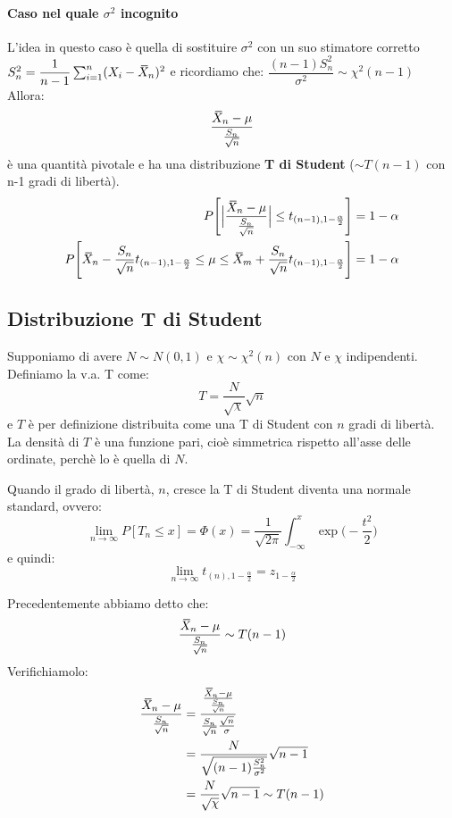 \documentclass[12pt]{report}
\newcommand{\wbar}[1]{%
	\accentset{\mbox{\rule{0.55em}{0.5pt}}}{#1}%
}
\begin{document}
	 \paragraph{Caso nel quale $\sigma^2$ incognito} L'idea in questo caso è quella di sostituire $\sigma^2$ con un suo stimatore corretto $S_n^2 = \dfrac{1}{n-1}\sum_{i=1}^{n}(X_i - \wbar{X}_n)^2$ e ricordiamo che: $\dfrac{(n-1)S_n^2}{\sigma^2} \sim \chi^2(n-1)$ \\
	 Allora:
	 \[
	 \dfrac{\wbar{X}_n - \mu}{\frac{S_n}{\sqrt{n}}}
	 \]
	 è una quantità pivotale e ha una distribuzione \textbf{T di Student} ($\sim T(n-1)$ con n-1 gradi di libertà). \\
	 \begin{align*}
	 	P\Bigg[\Big|\dfrac{\wbar{X}_n - \mu}{\frac{S_n}{\sqrt{n}}}\Big| \leq t_{(n-1), 1 - \frac{\alpha}{2}}\Bigg] &= 1 - \alpha \\
	 	P\Bigg[\wbar{X}_n - \frac{S_n}{\sqrt{n}}t_{(n-1), 1-\frac{\alpha}{2}} \leq \mu \leq \wbar{X}_m + \frac{S_n}{\sqrt{n}}t_{(n-1), 1 - \frac{\alpha}{2}}\Bigg] &= 1 - \alpha \\
	 \end{align*}
	 \subsection{Distribuzione T di Student}
	 Supponiamo di avere $N \sim N(0, 1)$ e $\chi \sim \chi^2(n)$ con $N$ e $\chi$ indipendenti. \\
	 Definiamo la v.a. T come:
	 \[
	 T = \dfrac{N}{\sqrt{\chi}}\sqrt{n}
	 \]
	 e $T$ è per definizione distribuita come una T di Student con $n$ gradi di libertà. \\
	 La densità di $T$ è una funzione pari, cioè simmetrica rispetto all'asse delle ordinate, perchè lo è quella di $N$.
	 \begin{note}{}{}
	 	Quando il grado di libertà, $n$, cresce la T di Student diventa una normale standard, ovvero:
	 	\[
	 	\lim_{n\to\infty}P[T_n \leq x] = \Phi(x) = \frac{1}{\sqrt{2\pi}}\int_{-\infty}^{x}\exp\Big(-\frac{t^2}{2}\Big)
	 	\]
	 	e quindi:
	 	\[
	 	\lim_{n\to\infty}t_{(n), 1-\frac{\alpha}{2}} = z_{1-\frac{\alpha}{2}}
	 	\]
	 \end{note}
	 Precedentemente abbiamo detto che:
	 \[
	 \dfrac{\wbar{X}_n -\mu}{\frac{S_n}{\sqrt{n}}} \sim T(n-1)
	 \]
	 Verifichiamolo:
	 \begin{align*}
	 \dfrac{\wbar{X}_n -\mu}{\frac{S_n}{\sqrt{n}}} &= \dfrac{\frac{\wbar{X}_n-\mu}{\frac{S_n}{\sqrt{n}}}}{\frac{S_n}{\sqrt{n}}\frac{\sqrt{n}}{\sigma}} \\
	 &= \dfrac{N}{\sqrt{(n-1)\frac{S_n^2}{\sigma^2}}}\sqrt{n-1} \\
	 &= \frac{N}{\sqrt{\chi}}\sqrt{n-1} \sim T(n-1)
	 \end{align*}
\end{document}
